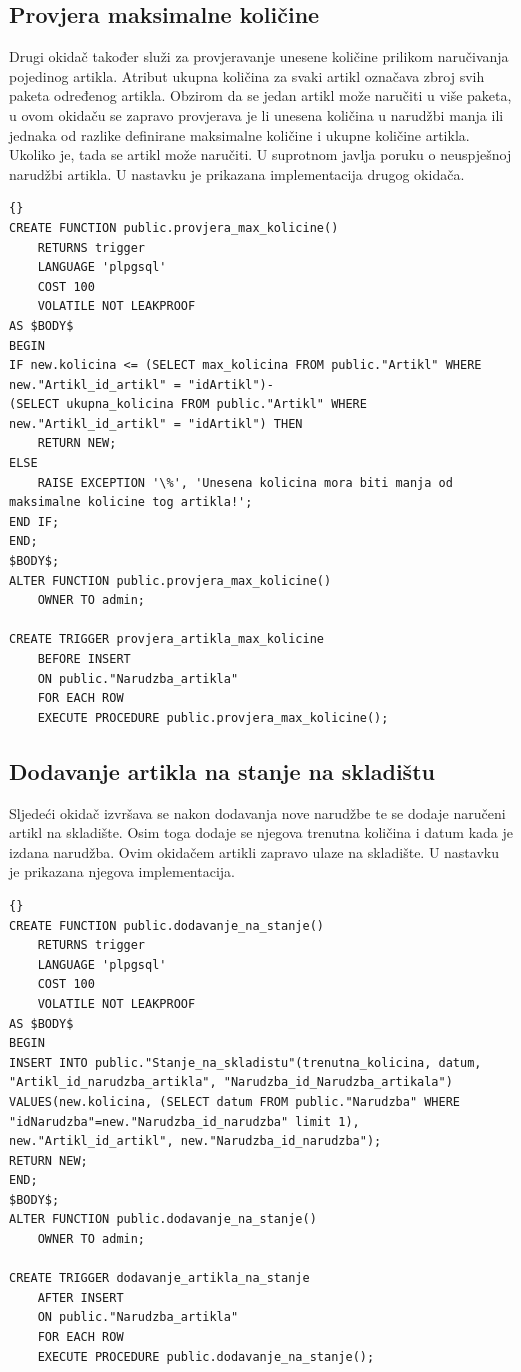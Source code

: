 \documentclass{foi}
\begin{document}
\subsection{Provjera maksimalne količine}
Drugi okidač također služi za provjeravanje unesene količine prilikom naručivanja pojedinog artikla. Atribut ukupna količina za svaki artikl označava zbroj svih paketa određenog artikla. Obzirom da se jedan artikl može naručiti u više paketa, u ovom okidaču se zapravo provjerava je li unesena količina u narudžbi manja ili jednaka od razlike definirane maksimalne količine i ukupne količine artikla. Ukoliko je, tada se artikl može naručiti. U suprotnom javlja poruku o neuspješnoj narudžbi artikla.
U nastavku je prikazana implementacija drugog okidača.
\lstset{commentstyle=\textit,language=python}
\begin{lstlisting}[frame=tb]{}
CREATE FUNCTION public.provjera_max_kolicine()
    RETURNS trigger
    LANGUAGE 'plpgsql'
    COST 100
    VOLATILE NOT LEAKPROOF
AS $BODY$
BEGIN
IF new.kolicina <= (SELECT max_kolicina FROM public."Artikl" WHERE new."Artikl_id_artikl" = "idArtikl")-
(SELECT ukupna_kolicina FROM public."Artikl" WHERE new."Artikl_id_artikl" = "idArtikl") THEN
	RETURN NEW;
ELSE
	RAISE EXCEPTION '\%', 'Unesena kolicina mora biti manja od maksimalne kolicine tog artikla!';
END IF;
END;
$BODY$;
ALTER FUNCTION public.provjera_max_kolicine()
    OWNER TO admin;
    
CREATE TRIGGER provjera_artikla_max_kolicine
    BEFORE INSERT
    ON public."Narudzba_artikla"
    FOR EACH ROW
    EXECUTE PROCEDURE public.provjera_max_kolicine();
\end{lstlisting}

\subsection{Dodavanje artikla na stanje na skladištu}
Sljedeći okidač izvršava se nakon dodavanja nove narudžbe te se dodaje naručeni artikl na skladište. Osim toga dodaje se njegova trenutna količina i datum kada je izdana narudžba. Ovim okidačem artikli zapravo ulaze na skladište. U nastavku je prikazana njegova implementacija.
\lstset{commentstyle=\textit,language=python}
\begin{lstlisting}[frame=tb]{}
CREATE FUNCTION public.dodavanje_na_stanje()
    RETURNS trigger
    LANGUAGE 'plpgsql'
    COST 100
    VOLATILE NOT LEAKPROOF
AS $BODY$
BEGIN
INSERT INTO public."Stanje_na_skladistu"(trenutna_kolicina, datum, "Artikl_id_narudzba_artikla", "Narudzba_id_Narudzba_artikala")
VALUES(new.kolicina, (SELECT datum FROM public."Narudzba" WHERE "idNarudzba"=new."Narudzba_id_narudzba" limit 1), new."Artikl_id_artikl", new."Narudzba_id_narudzba");
RETURN NEW;
END;
$BODY$;
ALTER FUNCTION public.dodavanje_na_stanje()
    OWNER TO admin;
    
CREATE TRIGGER dodavanje_artikla_na_stanje
    AFTER INSERT
    ON public."Narudzba_artikla"
    FOR EACH ROW
    EXECUTE PROCEDURE public.dodavanje_na_stanje();
\end{lstlisting}
\end{document}
